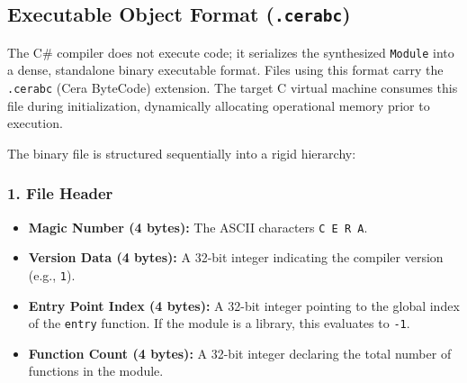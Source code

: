 \documentclass[11pt, a4paper]{article}
\begin{document}
\subsection{Executable Object Format (\texttt{.cerabc})}
\noindent
The C\# compiler does not execute code; it serializes the synthesized \texttt{Module} into a dense, standalone binary executable format. Files using this format carry the \texttt{.cerabc} (Cera ByteCode) extension. The target C virtual machine consumes this file during initialization, dynamically allocating operational memory prior to execution.

The binary file is structured sequentially into a rigid hierarchy:

\subsubsection*{1. File Header}
\begin{itemize}
    \item \textbf{Magic Number (4 bytes):} The ASCII characters \texttt{C E R A}.
    \item \textbf{Version Data (4 bytes):} A 32-bit integer indicating the compiler version (e.g., \texttt{1}).
    \item \textbf{Entry Point Index (4 bytes):} A 32-bit integer pointing to the global index of the \texttt{entry} function. If the module is a library, this evaluates to \texttt{-1}.
    \item \textbf{Function Count (4 bytes):} A 32-bit integer declaring the total number of functions in the module.
\end{itemize}
\end{document}
